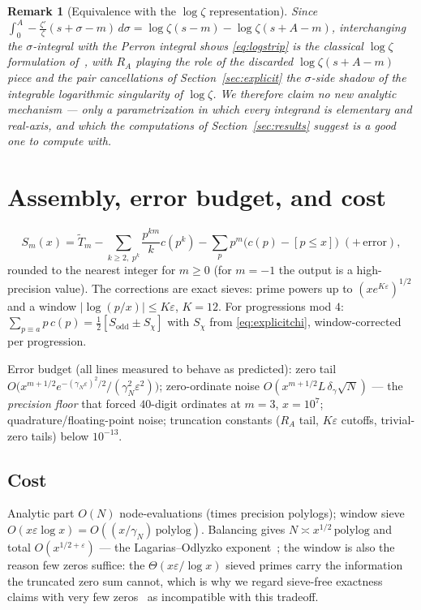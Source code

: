 \documentclass[11pt]{article}
\newtheorem{remark}{Remark}
\newcommand{\eps}{\varepsilon}
\begin{document}
\begin{remark}[Equivalence with the $\log\zeta$ representation]
Since $\int_0^A-\frac{\zeta'}{\zeta}(s+\sigma-m)\,d\sigma
=\log\zeta(s-m)-\log\zeta(s+A-m)$, interchanging the $\sigma$-integral
with the Perron integral shows \eqref{eq:logstrip} is the classical
$\log\zeta$ formulation of~\cite{LO87,Platt15}, with $R_A$ playing the
role of the discarded $\log\zeta(s+A-m)$ piece and the pair cancellations
of Section~\ref{sec:explicit} the $\sigma$-side shadow of the integrable
logarithmic singularity of $\log\zeta$. We therefore claim no new analytic
mechanism --- only a parametrization in which every integrand is
elementary and real-axis, and which the computations of
Section~\ref{sec:results} suggest is a good one to compute with.
\end{remark}

\section{Assembly, error budget, and cost}\label{sec:algorithm}

\begin{equation}\label{eq:assembly}
  S_m(x)=\widetilde T_m
  -\!\!\sum_{k\ge2,\;p^k}\!\!\frac{p^{km}}k c(p^k)
  -\sum_{p}p^{m}\bigl(c(p)-[p\le x]\bigr)\;(+\,\text{error}),
\end{equation}
rounded to the nearest integer for $m\ge0$ (for $m=-1$ the output is a
high-precision value). The corrections are exact sieves: prime powers up
to $(xe^{K\eps})^{1/2}$ and a window $|\log(p/x)|\le K\eps$, $K=12$. For
progressions mod $4$: $\sum_{p\equiv a}p\,c(p)=\tfrac12[S_{\mathrm{odd}}
\pm S_\chi]$ with $S_\chi$ from \eqref{eq:explicitchi}, window-corrected
per progression.

Error budget (all lines measured to behave as predicted): zero tail
$O\!\bigl(x^{m+1/2}e^{-(\gamma_N\eps)^2/2}/(\gamma_N^2\eps^2)\bigr)$;
zero-ordinate noise $O(x^{m+1/2}L\,\delta_\gamma\sqrt N)$ --- the
\emph{precision floor} that forced $40$-digit ordinates at $m=3$,
$x=10^7$; quadrature/floating-point noise; truncation constants
($R_A$ tail, $K\eps$ cutoffs, trivial-zero tails) below $10^{-13}$.

\subsection{Cost}\label{sec:complexity}
Analytic part $O(N)$ node-evaluations (times precision polylogs); window
sieve $O(x\eps\log x)=O((x/\gamma_N)\,\mathrm{polylog})$. Balancing gives
$N\asymp x^{1/2}\,\mathrm{polylog}$ and total $O(x^{1/2+\eps})$ --- the
Lagarias--Odlyzko exponent~\cite{LO87}; the window is also the reason few
zeros suffice: the $\Theta(x\eps/\log x)$ sieved primes carry the
information the truncated zero sum cannot, which is why we regard
sieve-free exactness claims with very few zeros~\cite{TG25} as
incompatible with this tradeoff.
\end{document}

